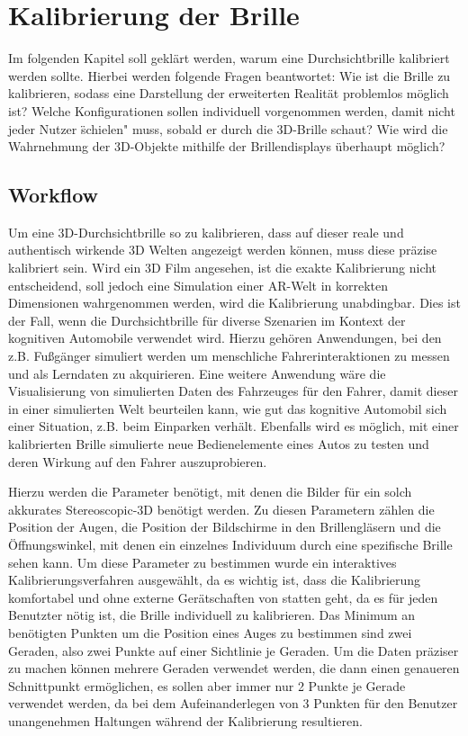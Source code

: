 \section{Kalibrierung der Brille}
Im folgenden Kapitel soll geklärt werden, warum eine Durchsichtbrille kalibriert werden sollte. Hierbei werden folgende Fragen beantwortet: Wie ist die Brille zu kalibrieren, sodass eine Darstellung der erweiterten Realität problemlos möglich ist? Welche Konfigurationen sollen individuell vorgenommen werden, damit nicht jeder Nutzer \" schielen" muss, sobald er durch die 3D-Brille schaut? Wie wird die Wahrnehmung der 3D-Objekte mithilfe der Brillendisplays überhaupt möglich?

\subsection{Workflow}
Um eine 3D-Durchsichtbrille so zu kalibrieren, dass auf dieser reale und authentisch wirkende 3D Welten angezeigt werden können, muss diese präzise kalibriert sein. Wird ein 3D Film angesehen, ist die exakte Kalibrierung nicht entscheidend, soll jedoch eine Simulation einer AR-Welt in korrekten Dimensionen wahrgenommen werden, wird die Kalibrierung unabdingbar. Dies ist der Fall, wenn die Durchsichtbrille für diverse Szenarien im Kontext der kognitiven Automobile verwendet wird. Hierzu gehören Anwendungen, bei den z.B. Fußgänger simuliert werden um menschliche Fahrerinteraktionen zu messen und als Lerndaten zu akquirieren. Eine weitere Anwendung wäre die Visualisierung von simulierten Daten des Fahrzeuges für den Fahrer, damit dieser in einer simulierten Welt beurteilen kann, wie gut das kognitive Automobil sich einer Situation, z.B. beim Einparken verhält. Ebenfalls wird es möglich, mit einer kalibrierten Brille simulierte neue Bedienelemente eines Autos zu testen und deren Wirkung auf den Fahrer auszuprobieren.

Hierzu werden die Parameter benötigt, mit denen die Bilder für ein solch akkurates Stereoscopic-3D benötigt werden. Zu diesen Parametern zählen die Position der Augen, die Position der Bildschirme in den Brillengläsern und die Öffnungswinkel, mit denen ein einzelnes Individuum durch eine spezifische Brille sehen kann. Um diese Parameter zu bestimmen wurde ein interaktives Kalibrierungsverfahren ausgewählt, da es wichtig ist, dass die Kalibrierung komfortabel und ohne externe Gerätschaften von statten geht, da es für jeden Benutzter nötig ist, die Brille individuell zu kalibrieren. Das Minimum an benötigten Punkten um die Position eines Auges zu bestimmen sind zwei Geraden, also zwei Punkte auf einer Sichtlinie je Geraden. Um die Daten präziser zu machen können mehrere Geraden verwendet werden, die dann einen genaueren Schnittpunkt ermöglichen, es sollen aber immer nur 2 Punkte je Gerade verwendet werden, da bei dem Aufeinanderlegen von 3 Punkten für den Benutzer unangenehmen Haltungen während der Kalibrierung resultieren.

